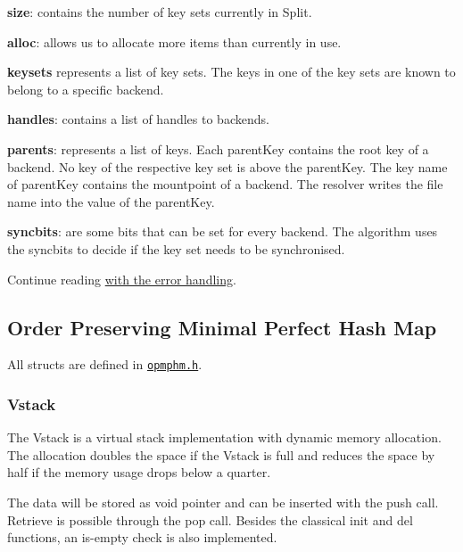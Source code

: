 \begin{DoxyItemize}
\item {\bfseries size}\+: contains the number of key sets currently in {\ttfamily Split}.
\item {\bfseries alloc}\+: allows us to allocate more items than currently in use.
\item {\bfseries keysets} represents a list of key sets. The keys in one of the key sets are known to belong to a specific backend.
\item {\bfseries handles}\+: contains a list of handles to backends.
\item {\bfseries parents}\+: represents a list of keys. Each {\ttfamily parent\+Key} contains the root key of a backend. No key of the respective key set is above the {\ttfamily parent\+Key}. The key name of {\ttfamily parent\+Key} contains the mountpoint of a backend. The resolver writes the file name into the value of the {\ttfamily parent\+Key}.
\item {\bfseries syncbits}\+: are some bits that can be set for every backend. The algorithm uses the {\ttfamily syncbits} to decide if the key set needs to be synchronised.
\end{DoxyItemize}

Continue reading \hyperlink{md_doc_help_elektra-error-handling_doc_help_elektra-error-handling_md}{with the error handling}.

\subsection*{Order Preserving Minimal Perfect Hash Map}

All structs are defined in \href{/home/markus/Projekte/Elektra/current/src/include/kdbopmphm.h}{\tt opmphm.\+h}.

\subsubsection*{Vstack}

The {\ttfamily Vstack} is a virtual stack implementation with dynamic memory allocation. The allocation doubles the space if the {\ttfamily Vstack} is full and reduces the space by half if the memory usage drops below a quarter.

The data will be stored as void pointer and can be inserted with the push call. Retrieve is possible through the pop call. Besides the classical init and del functions, an is-\/empty check is also implemented.

